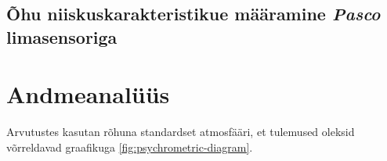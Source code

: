 \documentclass[
  12pt,
  a4paper,
  onecolumn, twoside]{article}
\begin{document}
\hypertarget{uxf5hu-niiskuskarakteristikue-muxe4uxe4ramine-pasco-limasensoriga}{%
\subsection{\texorpdfstring{Õhu niiskuskarakteristikue määramine \emph{Pasco} limasensoriga}{Õhu niiskuskarakteristikue määramine Pasco limasensoriga}}\label{uxf5hu-niiskuskarakteristikue-muxe4uxe4ramine-pasco-limasensoriga}}

\hypertarget{andmeanaluxfcuxfcs}{%
\section{Andmeanalüüs}\label{andmeanaluxfcuxfcs}}

Arvutustes kasutan rõhuna standardset atmosfääri, et tulemused oleksid võrreldavad graafikuga \ref{fig:psychrometric-diagram}.
\end{document}
